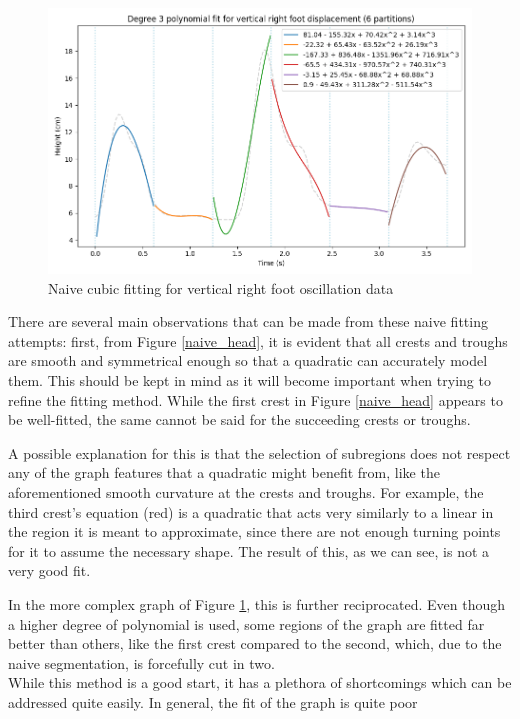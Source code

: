 \documentclass[12pt, a4paper]{article}
\begin{document}
\begin{figure}[H]
    \centering
    \includegraphics[width=12cm]{p_naive_right_3.png}
    \caption{Naive cubic fitting for vertical right foot oscillation data}
    \label{naive_right}
\end{figure}

There are several main observations that can be made from these naive fitting
attempts: first, from Figure \ref{naive_head}, it is evident that all crests and
troughs are smooth and symmetrical enough so that a quadratic can accurately
model them. This should be kept in mind as it will become important when trying
to refine the fitting method. While the first crest in Figure \ref{naive_head}
appears to be well-fitted, the same cannot be said for the succeeding crests or
troughs.

A possible explanation for this is that the selection of subregions does not
respect any of the graph features that a quadratic might benefit from, like the
aforementioned smooth curvature at the crests and troughs. For example, the
third crest's equation (red) is a quadratic that acts very similarly to a linear
in the region it is meant to approximate, since there are not enough turning
points for it to assume the necessary shape. The result of this, as we can see,
is not a very good fit.

In the more complex graph of Figure \ref{naive_right}, this is further
reciprocated. Even though a higher degree of polynomial is used, some regions of
the graph are fitted far better than others, like the first crest compared to
the second, which, due to the naive segmentation, is forcefully cut in two.  \\

While this method is a good start, it has a plethora of shortcomings which can
be addressed quite easily. In general, the fit of the graph is quite poor 
\end{document}
